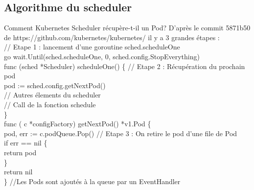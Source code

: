 \documentclass{bredelebeamer}
\begin{document}
\subsection{Algorithme du scheduler}
\begin{frame}{Comment Kubernetes Scheduler récupère-t-il un Pod?}
D'après le commit 5871b50 de https://github.com/kubernetes/kubernetes/ il y a 3 grandes étapes : 
\vspace{10px} \\

\textcolor{Framavert}{// Etape 1 : lancement d'une goroutine sched.scheduleOne\\}
\textcolor{Framarouge}{go} wait.\textcolor{Framableu}{Until}(sched.scheduleOne, \textcolor{Framableu}{0}, sched.config.StopEverything) \pause
\vspace{10px}\\
\textcolor{Framarouge}{func }\textcolor{Framaviolet}{(}\textcolor{Framaorange}{sched }\textcolor{Framaviolet}{*}\textcolor{Framaorange}{Scheduler}\textcolor{Framaviolet}{)} \textcolor{Framaviolet}{scheduleOne}() \{ \textcolor{Framavert}{// Etape 2  : Récupération du prochain pod} \\
\hspace{10px}	pod \textcolor{Framarouge}{:=} sched.config.\textcolor{Framableu}{getNextPod}() \\
\hspace{10px}    \textcolor{Framavert}{// Autres élements du scheduler}\\
\hspace{10px}    \textcolor{Framavert}{// Call de la fonction schedule}\\
\} \\ 
\pause
\vspace{10px} 
\textcolor{Framarouge}{func} \textcolor{Framaviolet}{(}
\textcolor{Framaorange}{c} \textcolor{Framaviolet}{*}\textcolor{Framaorange}{configFactory}\textcolor{Framaviolet}{) getNextPod()} *\textcolor{Framaorange}{v1.Pod} \{  \\
\hspace{10px}pod, err \textcolor{Framarouge}{:=} c.podQueue.\textcolor{Framableu}{Pop}() \textcolor{Framavert}{// Etape 3 : On retire le pod d'une file de Pod}\\
\hspace{10px}\textcolor{Framaorange}{if} err == \textcolor{Framableu}{nil} \{ \\
\hspace{10px}\hspace{10px}	return pod \\
\hspace{10px}	\} \\
\hspace{10px}	return  \textcolor{Framableu}{nil}\\
\} \pause
\textcolor{Framavert}{//Les Pods sont ajoutés à la queue par un EventHandler}

\end{frame}
\end{document}
